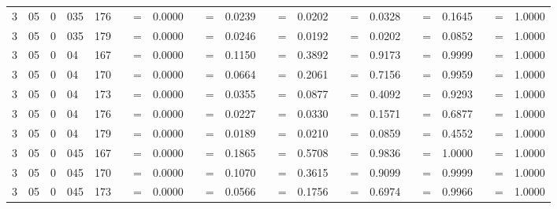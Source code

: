 \begin{tabular*}{260mm}{r@{.}lr@{.}lc|ccc:ccc:ccc:ccc:ccc|ccc}
		3&05	&	0&035	&	176	&	\nicefrac{}{} &=& 0.0000 & 	 &=& 0.0239 & 	 &=& 0.0202 & 	 &=& 0.0328 & 	 &=& 0.1645 & 	 &=& 1.0000 \\ 
		3&05	&	0&035	&	179	&	\nicefrac{}{} &=& 0.0000 & 	 &=& 0.0246 & 	 &=& 0.0192 & 	 &=& 0.0202 & 	 &=& 0.0852 & 	 &=& 1.0000 \\ 
		3&05	&	0&04	&	167	&	\nicefrac{}{} &=& 0.0000 & 	 &=& 0.1150 & 	 &=& 0.3892 & 	 &=& 0.9173 & 	 &=& 0.9999 & 	 &=& 1.0000 \\ 
		3&05	&	0&04	&	170	&	\nicefrac{}{} &=& 0.0000 & 	 &=& 0.0664 & 	 &=& 0.2061 & 	 &=& 0.7156 & 	 &=& 0.9959 & 	 &=& 1.0000 \\ 
		3&05	&	0&04	&	173	&	\nicefrac{}{} &=& 0.0000 & 	 &=& 0.0355 & 	 &=& 0.0877 & 	 &=& 0.4092 & 	 &=& 0.9293 & 	 &=& 1.0000 \\ 
		3&05	&	0&04	&	176	&	\nicefrac{}{} &=& 0.0000 & 	 &=& 0.0227 & 	 &=& 0.0330 & 	 &=& 0.1571 & 	 &=& 0.6877 & 	 &=& 1.0000 \\ 
		3&05	&	0&04	&	179	&	\nicefrac{}{} &=& 0.0000 & 	 &=& 0.0189 & 	 &=& 0.0210 & 	 &=& 0.0859 & 	 &=& 0.4552 & 	 &=& 1.0000 \\ 
		3&05	&	0&045	&	167	&	\nicefrac{}{} &=& 0.0000 & 	 &=& 0.1865 & 	 &=& 0.5708 & 	 &=& 0.9836 & 	 &=& 1.0000 & 	 &=& 1.0000 \\ 
		3&05	&	0&045	&	170	&	\nicefrac{}{} &=& 0.0000 & 	 &=& 0.1070 & 	 &=& 0.3615 & 	 &=& 0.9099 & 	 &=& 0.9999 & 	 &=& 1.0000 \\ 
		3&05	&	0&045	&	173	&	\nicefrac{}{} &=& 0.0000 & 	 &=& 0.0566 & 	 &=& 0.1756 & 	 &=& 0.6974 & 	 &=& 0.9966 & 	 &=& 1.0000 \\ 

\end{tabular*}
